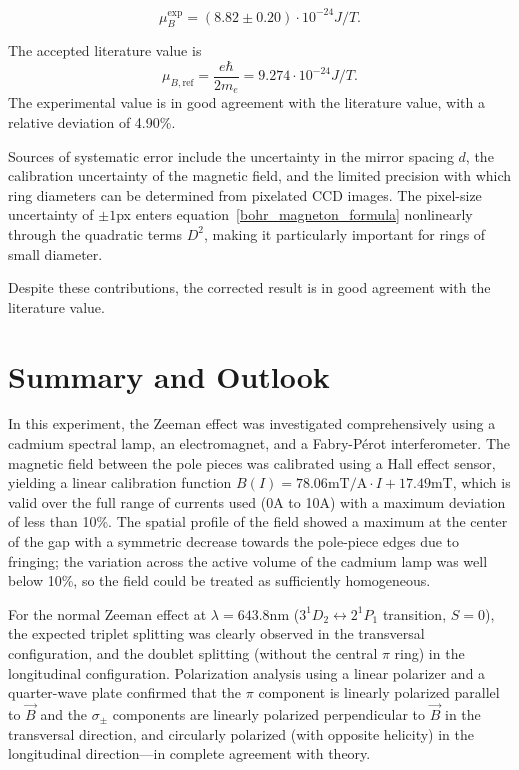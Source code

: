 \documentclass{article}
\begin{document}
\begin{equation}
   \mu_B^\mathrm{exp} = (8.82 \pm 0.20) \cdot 10^{-24}J/T.
\end{equation}

The accepted literature value is
\begin{equation}
    \mu_{B,\mathrm{ref}} = \frac{e\hbar}{2m_e} = 9.274 \cdot 10^{-24}J/T.
\end{equation}
The experimental value is in good agreement with the literature value, with a relative deviation of 4.90\%.

Sources of systematic error include the uncertainty in the mirror spacing $d$, the calibration uncertainty of the magnetic field, and the limited precision with which ring diameters can be determined from pixelated CCD images. 
The pixel-size uncertainty of $\pm 1$px enters equation~\eqref{bohr_magneton_formula} nonlinearly through the quadratic terms $D^2$, making it particularly important for rings of small diameter.

Despite these contributions, the corrected result is in good agreement with the literature value.

\section{Summary and Outlook}

In this experiment, the Zeeman effect was investigated comprehensively using a cadmium spectral lamp, an electromagnet, and a Fabry-Pérot interferometer. The magnetic field between the pole pieces was calibrated using a Hall effect sensor, yielding a linear calibration function $B(I) = 78.06\mathrm{mT/A} \cdot I + 17.49$mT, which is valid over the full range of currents used (0A to 10A) with a maximum deviation of less than 10\%. The spatial profile of the field showed a maximum at the center of the gap with a symmetric decrease towards the pole-piece edges due to fringing; the variation across the active volume of the cadmium lamp was well below 10\%, so the field could be treated as sufficiently homogeneous.

For the normal Zeeman effect at $\lambda = 643.8$nm ($3^1D_2 \leftrightarrow 2^1P_1$ transition, $S=0$), the expected triplet splitting was clearly observed in the transversal configuration, and the doublet splitting (without the central $\pi$ ring) in the longitudinal configuration. Polarization analysis using a linear polarizer and a quarter-wave plate confirmed that the $\pi$ component is linearly polarized parallel to $\vec{B}$ and the $\sigma_\pm$ components are linearly polarized perpendicular to $\vec{B}$ in the transversal direction, and circularly polarized (with opposite helicity) in the longitudinal direction—in complete agreement with theory.
\end{document}
